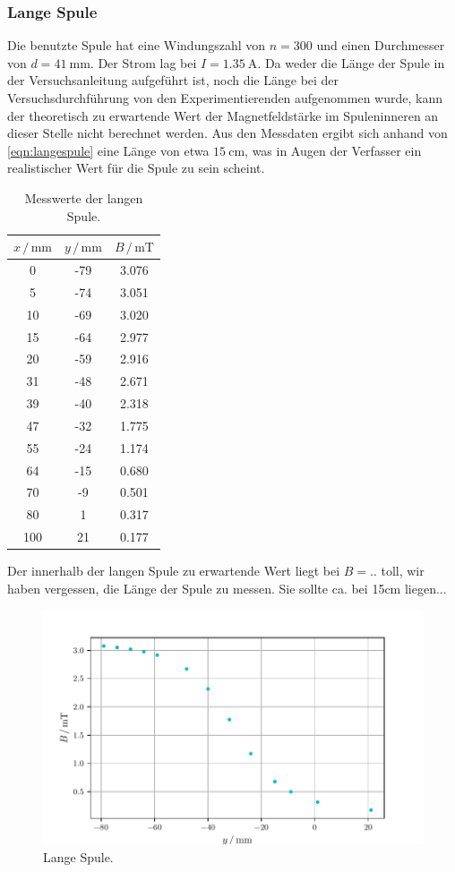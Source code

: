     \subsubsection{Lange Spule}
    Die benutzte Spule hat eine Windungszahl von $n=300$ und einen Durchmesser von $d=\SI{41}{\milli\m}$. 
    Der Strom lag bei $I=\SI{1.35}{\ampere}$. Da weder die Länge der Spule in der Versuchsanleitung aufgeführt ist, noch 
    die Länge bei der Versuchsdurchführung von den Experimentierenden aufgenommen wurde, kann der theoretisch zu erwartende 
    Wert der Magnetfeldstärke im Spuleninneren an dieser Stelle nicht berechnet werden. 
    Aus den Messdaten ergibt sich anhand von \eqref{eqn:langespule} eine Länge von etwa $\SI{15}{\centi\m}$, was in Augen 
    der Verfasser ein realistischer 
    Wert für die Spule zu sein scheint.
    \begin{table}
    \centering
    \caption{Messwerte der langen Spule.}
    \label{tab:langSp}
        \begin{tabular}{S[table-format=3.0] S[table-format=2.0] S[table-format=2.2]}
            \toprule
            {$x\,/\,\mathrm{mm}$} & {$y\,/\,\mathrm{mm}$} & {$B\,/\,\mathrm{mT}$}\\
               & -79   & 3.076 \\
            5   & -74   & 3.051 \\
            10  & -69   & 3.020 \\
            15  & -64   & 2.977 \\
            20  & -59   & 2.916 \\
            31  & -48   & 2.671 \\
            39  & -40   & 2.318 \\
            47  & -32   & 1.775 \\
            55  & -24   & 1.174 \\
            64  & -15   & 0.680 \\
            70  & -9    & 0.501 \\
            80  & 1     & 0.317 \\
            100 & 21    & 0.177 \\
            \bottomrule
        \end{tabular}
    \end{table}
    Der innerhalb der langen Spule zu erwartende Wert liegt bei $B=$.. toll, wir haben vergessen, die Länge der Spule zu messen.
    Sie sollte ca. bei 15cm liegen... 
    \begin{figure}
        \centering
        \includegraphics[width=\textwidth]{Plots/plot_langSp.pdf}
        \caption{Lange Spule.}
        \label{fig:lang}
    \end{figure}